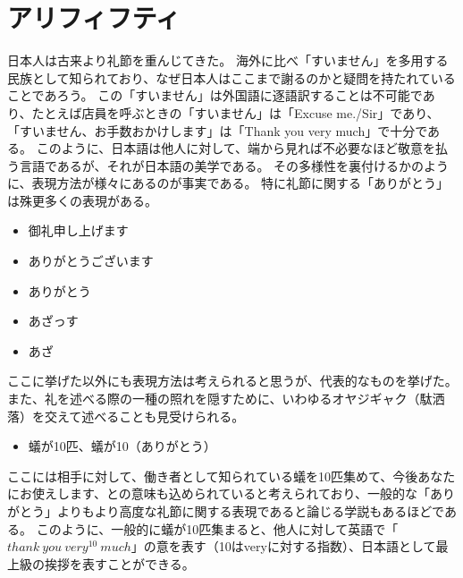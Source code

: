 \renewcommand{\appendixname}{Appendix~}
\appendix
\section{アリフィフティ}
日本人は古来より礼節を重んじてきた。
海外に比べ「すいません」を多用する民族として知られており、なぜ日本人はここまで謝るのかと疑問を持たれていることであろう。
この「すいません」は外国語に逐語訳することは不可能であり、たとえば店員を呼ぶときの「すいません」は「Excuse me./Sir」であり、「すいません、お手数おかけします」は「Thank you very much」で十分である。
このように、日本語は他人に対して、端から見れば不必要なほど敬意を払う言語であるが、それが日本語の美学である。
その多様性を裏付けるかのように、表現方法が様々にあるのが事実である。
特に礼節に関する「ありがとう」は殊更多くの表現がある。
\begin{itemize}
\item 御礼申し上げます
\item ありがとうございます
\item ありがとう
\item あざっす
\item あざ
\end{itemize}
ここに挙げた以外にも表現方法は考えられると思うが、代表的なものを挙げた。
また、礼を述べる際の一種の照れを隠すために、いわゆるオヤジギャク（駄洒落）を交えて述べることも見受けられる。
\begin{itemize}
\item 蟻が10匹、蟻が10（ありがとう）
\end{itemize}
ここには相手に対して、働き者として知られている蟻を10匹集めて、今後あなたにお使えします、との意味も込められていると考えられており、一般的な「ありがとう」よりもより高度な礼節に関する表現であると論じる学説もあるほどである。
このように、一般的に蟻が10匹集まると、他人に対して英語で「$thank\ you\ very^{10}\ much$」の意を表す（10はveryに対する指数）、日本語として最上級の挨拶を表すことができる。

\par

